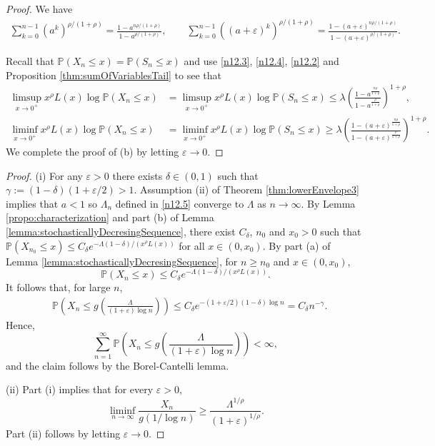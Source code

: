 \documentclass[bj]{imsart}
\numberwithin{equation}{section}
\renewcommand{\P}{\mathbb{P}}
\newcommand{\1}{\mathbf{1}}
\theoremstyle{definition}
\newcommand{\eps}{\varepsilon}
\begin{document}
\begin{proof}
We have
\begin{align}\label{n12.2}
\sum_{k=0}^{n-1} (a^k)^{\rho/(1+\rho)}
=\frac{1-a^{n\rho/(1+\rho)}}{1-a^{\rho/(1+\rho)}},
\qquad 
\sum_{k=0}^{n-1} ((a+\eps)^k)^{\rho/(1+\rho)}
=\frac{1-(a+\eps)^{n\rho/(1+\rho)}}{1-(a+\eps)^{\rho/(1+\rho)}}.
\end{align}

Recall that $\P(X_n\leq x)=\P(S_n\leq x)$ and use \eqref{n12.3}, \eqref{n12.4}, \eqref{n12.2} and Proposition \ref{thm:sumOfVariablesTail} to see that
\begin{align*}
\limsup_{x\to 0^+} x^\rho L(x) \log \P(X_n\leq x) 
&=
\limsup_{x\to 0^+} x^\rho L(x) \log \P(S_n\leq x) \leq \lambda\left(\frac{1-a^{\frac{n\rho}{1+\rho}}}{1-a^{\frac{\rho}{1+\rho}}}\right)^{1+\rho},\\
\liminf_{x\to 0^+} x^\rho L(x)\log \P(X_n\leq x)
&=\liminf_{x\to 0^+} x^\rho L(x)\log \P(S_n\leq x)
\geq
\lambda\left(\frac{1-(a+\varepsilon)^{\frac{n\rho}{1+\rho}}}{1-(a+\varepsilon)^{\frac{\rho}{1+\rho}}}\right)^{1+\rho}.
\end{align*}
We complete the proof of (b)
by letting $\varepsilon\to 0$.
\end{proof}

\begin{proof}
(i) For any $\eps>0$
there exists $\delta\in(0,1)$ such that $\gamma := (1-\delta)(1+\varepsilon/2)>1$. 
Assumption (ii) of Theorem \ref{thm:lowerEnvelope3} implies that $a<1$ so $\Lambda_n$ defined in \eqref{n12.5} converge to $\Lambda$ as $n\to\infty$.
By Lemma \ref{propo:characterization} and
part (b) of Lemma \ref{lemma:stochasticallyDecresingSequence},
there exist $C_\delta$, $n_0$ and $x_0>0$ such that $\P(X_{n_0}\leq x)\leq C_\delta e^{-\Lambda(1-\delta)/(x^\rho L(x))}$ for all $x\in (0,x_0)$.
By part (a) of Lemma \ref{lemma:stochasticallyDecresingSequence}, for $n\geq n_0$ and $x\in (0,x_0)$,
$$\P(X_n\leq x)\leq C_\delta e^{-\Lambda(1-\delta)/(x^\rho L(x))}.$$
It follows that, for large $n$,
\begin{align*}
 &\P\left(X_n\leq g\left(\frac{\Lambda}{(1+\varepsilon)\log n}\right)\right)
\leq C_\delta e^{-(1+\varepsilon/2)(1-\delta)\log n}=C_{\delta}n^{-\gamma}.
\end{align*}
Hence, 
$$\sum_{n=1}^{\infty}\P\left(X_n\leq g\left(\frac{\Lambda}{(1+\varepsilon)\log n}\right)\right)<\infty,$$
and the claim follows by the Borel-Cantelli lemma.

(ii) Part (i) implies that for every $\eps >0$,
$$\liminf_{n\to\infty}\frac{X_n}{g(1/\log n)}  \geq \frac{\Lambda^{1/\rho}}{(1+\varepsilon)^{1/\rho}}.$$
Part (ii) follows by letting $\eps\to0$. 
\end{proof}
\end{document}
